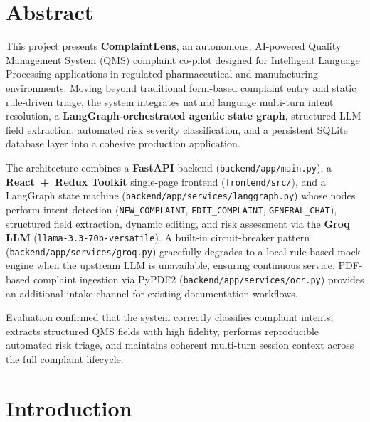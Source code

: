 \documentclass[12pt,a4paper]{report}
\begin{document}
\chapter*{Abstract}

This project presents \textbf{ComplaintLens}, an autonomous, AI-powered Quality Management System (QMS) complaint co-pilot designed for Intelligent Language Processing applications in regulated pharmaceutical and manufacturing environments. Moving beyond traditional form-based complaint entry and static rule-driven triage, the system integrates natural language multi-turn intent resolution, a \textbf{LangGraph-orchestrated agentic state graph}, structured LLM field extraction, automated risk severity classification, and a persistent SQLite database layer into a cohesive production application.

The architecture combines a \textbf{FastAPI} backend (\texttt{backend/\allowbreak app/\allowbreak main.py}), a \textbf{React~+~Redux Toolkit} single-page frontend (\texttt{frontend/\allowbreak src/}), and a LangGraph state machine (\texttt{backend/\allowbreak app/\allowbreak services/\allowbreak langgraph.py}) whose nodes perform intent detection (\texttt{NEW\_COMPLAINT}, \texttt{EDIT\_COMPLAINT}, \texttt{GENERAL\_CHAT}), structured field extraction, dynamic editing, and risk assessment via the \textbf{Groq LLM} (\texttt{llama-3.3-70b-versatile}). A built-in circuit-breaker pattern (\texttt{backend/\allowbreak app/\allowbreak services/\allowbreak groq.py}) gracefully degrades to a local rule-based mock engine when the upstream LLM is unavailable, ensuring continuous service. PDF-based complaint ingestion via PyPDF2 (\texttt{backend/\allowbreak app/\allowbreak services/\allowbreak ocr.py}) provides an additional intake channel for existing documentation workflows.

Evaluation confirmed that the system correctly classifies complaint intents, extracts structured QMS fields with high fidelity, performs reproducible automated risk triage, and maintains coherent multi-turn session context across the full complaint lifecycle.

\chapter*{Introduction}
\end{document}

